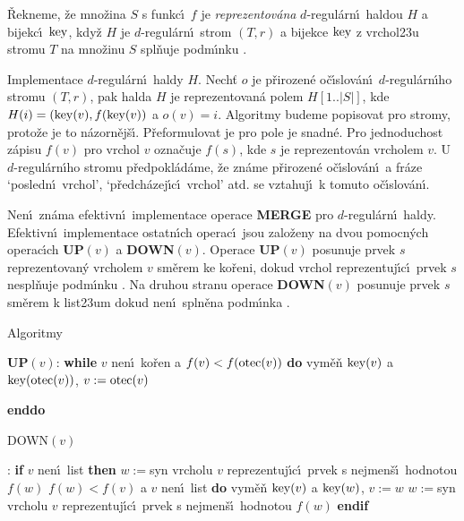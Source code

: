 \flushpar\v Rekneme, \v ze mno\v zina $S$ s funkc\'\i\ $f$ je 
\emph{reprezentov\'ana} $d$-regul\'ar\-n\'\i\ haldou $H$ a bijekc\'\i\ $\operatorname{key}$, kdy\v z 
$H$ je $d$-regul\'arn\'\i\ strom $(T,r)$ a bijekce $\operatorname{key}$ z vrchol\accent23u 
stromu $T$ na mno\v zinu $S$ spl\v nuje podm\'\i nku .  
\medskip

\flushpar Implementace $d$-regul\'arn\'\i\ haldy $H$. Nech\v t $o$ je 
p\v rirozen\'e o\v c\'\i s\-lo\-v\'a\-n\'\i\ $d$-regul\'arn\'\i ho stromu $
(T,r)$, pak halda $H$ je 
reprezentovan\'a polem $H[1..|S|]$, kde $H(i)=(\operatorname{key}(v),f(\operatorname{key}(v))$ a 
$o(v)=i$. Algoritmy budeme popisovat pro stromy, proto\v ze 
je to n\'azor\-n\v ej\-\v s\'\i . P\v reformulovat je pro pole je 
snadn\'e. Pro jednoduchost z\'apisu $f(v)$ pro vrchol $v$ 
ozna\v cuje $f(s)$, kde $s$ je reprezentov\'an vrcholem $v$. U 
$d$-regul\'arn\'\i ho stromu p\v redpo\-kl\'a\-d\'ame, \v ze zn\'ame p\v rirozen\'e 
o\v c\'\i slov\'an\'\i\ a fr\'aze `posledn\'\i\ vrchol', `p\v red\-ch\'azej\'\i c\'\i\ 
vrchol'  atd. se vztahuj\'\i\ k tomuto o\v c\'\i slov\'a\-n\'\i .
\medskip

\flushpar Nen\'\i\ zn\'ama efektivn\'\i\ implementace operace 
{\bf MERGE} pro $d$-regul\'arn\'\i\ haldy.  Efektivn\'\i\ implementace 
ostatn\'\i ch operac\'\i\ jsou zalo\v zeny na dvou pomocn\'ych 
operac\'\i ch {\bf UP$(v)$} a {\bf DOWN$(v)$}.  Operace {\bf UP$(
v)$} posunuje 
prvek $s$ reprezentovan\'y vrcholem $v$ sm\v erem ke ko\v reni, 
dokud vrchol reprezentuj\'\i c\'\i\ prvek $s$ nespl\v nu\-je podm\'\i nku 
. Na druhou stranu operace {\bf DOWN$(v)$} posunuje prvek $s$ sm\v erem k 
list\accent23um dokud nen\'\i\ spln\v ena podm\'\i nka \thetag{usp}.  
\bigskip

\subhead
Algoritmy
\endsubhead
\medskip

{\bf UP$(v)$}:\newline 
{\bf while} $v$ nen\'\i\ ko\v ren a $f(v)<f(\operatorname{otec}(v))$ {\bf do}\newline 
\phantom{---}vym\v e\v n $\operatorname{key}(v)$ a $\operatorname{key}(\operatorname{otec}(v))$, $v:=\operatorname{otec}(v)$\newline 
{\bf enddo
\medskip

DOWN$(v)$}:\newline 
{\bf if} $v$ nen\'\i\ list {\bf then\newline}
\phantom{---}$w:=$syn vrcholu $v$ reprezentuj\'\i c\'\i\ prvek s nejmen\v s\'\i\ 
hodnotou $f(w)$\newline 
\phantom{---}{\bf while} $f(w)<f(v)$ a $v$ nen\'\i\ list {\bf do\newline }
\phantom{------}vym\v e\v n $\operatorname{key}(v)$ a $\operatorname{key}(w)$, $v:=w$\newline 
\phantom{------}$w:=$syn vrcholu $v$ reprezentuj\'\i c\'\i\ prvek s nejmen\v s\'\i\ 
hodnotou $f(w)$\newline 
\phantom{---}{\bf enddo}\newline 
{\bf endif}
\medskip

